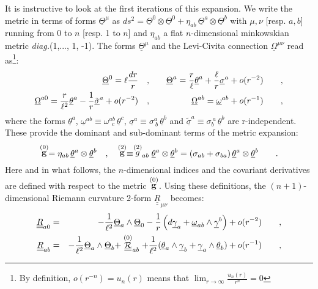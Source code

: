 \documentclass[a4paper,10pt]{article}
\begin{document}
It is instructive to look at the first iterations of this 
expansion. We write 
the metric in terms of forms $\underline{\Theta}^{ \mu}$ as 
$ds^2 = \underline{\Theta}^{ 0} \otimes \underline{\Theta}^{ 0} + 
\eta_{ a b} \, 
\underline{\Theta}^{ a} \otimes \underline{\Theta}^{ b}$ 
with $\mu, \nu$ [resp. $a, b$] running from 0 to $n$ [resp. 1 to $n$] and $\eta _{ a b}$ a 
flat $n$-dimensional minkowskian metric {\it diag.}(1,..., 1, -1). The forms  
$\underline{\Theta}^{ \mu}$ and the Levi-Civita connection 
$\underline{\Omega}^{\mu \nu}$ 
read as\footnote{By definition, $o(r^{-n})=u_n(r)$ means that 
  $\lim_{r\rightarrow \infty} \frac {u_n(r)}{r^{n}}=0$}: 
\begin{eqnarray} 
\label{FGTH} 
\underline{\Theta}^{ 0} = \ell{dr\over r} \quad &,& \quad 
\underline{\Theta}^{ a} = 
{r\over{\ell}} \underline{\theta}^{ a} + {\ell\over r} 
\underline{\sigma}^{ a} + 
o (r^{-2}) \qquad , \\ 
\label{FGOM} 
\underline{\Omega}^{a0}={r\over{\ell^2}} \underline{\theta}^{ a}  
 - {1 \over r} \underline{\tilde \sigma}^{a} + o (r^{-2}) 
 \quad &,& \quad 
\underline{\Omega}^{ab}= \underline{\omega}^{ab} +  o (r^{-1})\qquad , 
\end{eqnarray} 
where the forms $\underline {\theta}^{ a}$,  
$\underline{\omega}^{ab} \equiv {\omega}^{ab}_{\ \ c} \,  
\underline{\theta}^{ c}$, 
$\underline {\sigma}^{ a} \equiv  {\sigma}^{ a}_{\  b}  
\, \underline{\theta}^{ b}$ and 
$\underline {\tilde \sigma}^{ a} \equiv  {\sigma}_{ b}^{\  a}  
\, \underline{\theta}^{ b}$ 
are r-independent. These provide the dominant  
and sub-dominant terms of the metric expansion: 
\begin{equation} 
\label{gasymp} 
\stackrel {(0)}{\bf g}= \eta_{a   b}\, \underline{\theta}^{ a} \otimes 
\underline{\theta}^{ b} 
\quad , \quad  
\stackrel {(2)}{\bf g} \equiv 
\stackrel {(2)} g _{a b} \underline{\theta}^{ a}\otimes 
 \underline{\theta}^{ b} 
= \left ( \sigma_{ a  b} +  \sigma_{ b  a}\right ) 
\underline{\theta}^{ a} \otimes \underline{\theta}^{ b} \qquad . 
\end{equation} 
Here and in what follows, the $n$-dimensional indices 
and the covariant derivatives are defined 
with respect to the metric $\stackrel {(0)}{\bf g}$. 
Using these definitions, the $(n+1)$-dimensional 
Riemann curvature 2-form  
$\underline{\underline R}_{\mu \nu}$ becomes: 
\begin{eqnarray}   
\label{Ra0} 
\underline{\underline R}_{ a 0} &=& 
- \frac 1 {\ell^2} \underline{\Theta} _{ a} \wedge \underline{\Theta}_{ 
0}-{1\over r} 
\left(d\underline{\gamma}_{ a} + \underline{\omega}_{ a b} 
\wedge \underline{\gamma}^{ b} 
\right) + o(r^{-2}) \qquad , \\ 
\label{Rab} 
\underline{\underline R}_{ a b} &=& 
 - \frac 1 {\ell^2} \underline{\Theta}_{ a} \wedge 
\underline{\Theta}_{ b}+ 
\stackrel {(0)} {\underline{\underline {\cal R}}} _{ a b} + 
\frac 1 {\ell^2} (\underline{\theta}_{ a}\wedge \underline{\gamma}_{ b} 
+ \underline{\gamma}_{ a} \wedge \underline{\theta}_{ b}) + o(r^{-1}) \qquad , 
\end{eqnarray} 
\end{document}
